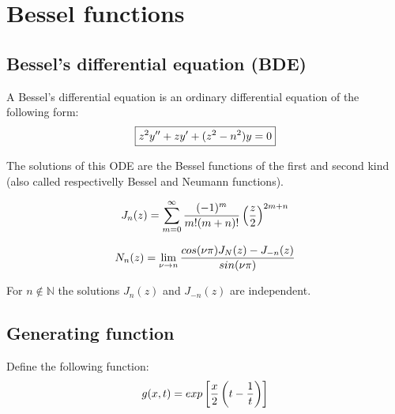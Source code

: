 \chapter{Bessel functions}
\section{Bessel's differential equation (BDE)}

	A Bessel's differential equation is an ordinary differential equation of the following form:
    \begin{equation}\index{Bessel!ordinary differential equation}
        \label{bessel:differential_equation}
		\boxed{z^2y'' + zy' + (z^2 - n^2)y = 0}
    \end{equation}
    
    \noindent The solutions of this ODE are the Bessel functions of the first and second kind (also called respectivelly Bessel and Neumann functions).
    
        
    \begin{equation}\index{Bessel!function}
		\label{bessel:bessel_function}
        J_n(z) = \sum_{m = 0}^\infty\frac{(-1)^m}{m!(m + n)!}\left(\frac{z}{2}\right)^{2m + n}
	\end{equation}
    
    \begin{equation}\index{Neumann function}
		\label{bessel:neumann_function}
        N_n(z) = \lim_{\nu\rightarrow n}\frac{cos(\nu \pi)J_N(z) - J_{-n}(z)}{sin(\nu\pi)}
	\end{equation}
    
    \begin{property}
		For $n\not\in\mathbb{N}$ the solutions $J_n(z)$ and $J_{-n}(z)$ are independent.
	\end{property}
    
\section{Generating function}
	Define the following function:
    \begin{equation}\index{Bessel!generating function}
		\label{bessel:generating_function}
        g(x, t) = exp\left[\stylefrac{x}{2}\left(t - \stylefrac{1}{t}\right)\right]
	\end{equation}
    
